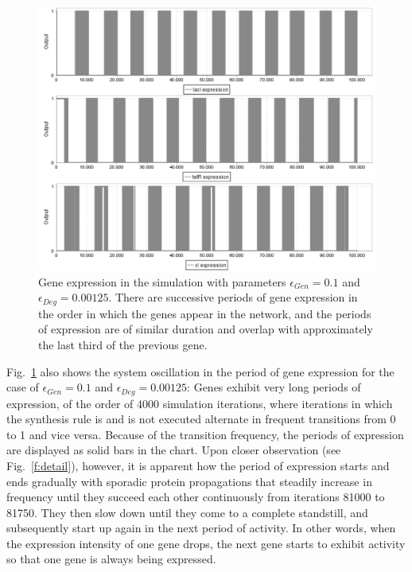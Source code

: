 \documentclass[runningheads,a4paper]{llncs}
\begin{document}
\begin{figure}
\begin{center}
\includegraphics[width=1\textwidth]{sim}
\caption{Gene expression in the simulation with parameters $\epsilon_{Gen} = 0.1$ and $\epsilon_{Deg} = 0.00125$. There are successive periods of gene expression in the order in which the genes appear in the network, and the periods of expression are of similar duration and overlap with approximately the last third of the previous gene.}
\label{f:sim2}
\end{center}
\end{figure}

Fig.~\ref{f:sim2} also shows the system oscillation in the period of gene expression for the case of $\epsilon_{Gen} = 0.1$ and $\epsilon_{Deg} = 0.00125$: Genes exhibit very long periods of expression, of the order of 4000 simulation iterations, where iterations in which the synthesis rule is and is not executed alternate in frequent transitions from 0 to 1 and vice versa. Because of the transition frequency, the periods of expression are displayed as solid bars in the chart. Upon closer observation (see Fig.~\ref{f:detail}), however, it is apparent how the period of expression starts and ends gradually with sporadic protein propagations that steadily increase in frequency until they succeed each other continuously from iterations 81000 to 81750. They then slow down until they come to a complete standstill, and subsequently start up again in the next period of activity. In other words, when the expression intensity of one gene drops, the next gene starts to exhibit activity so that one gene is always being expressed.
\end{document}
